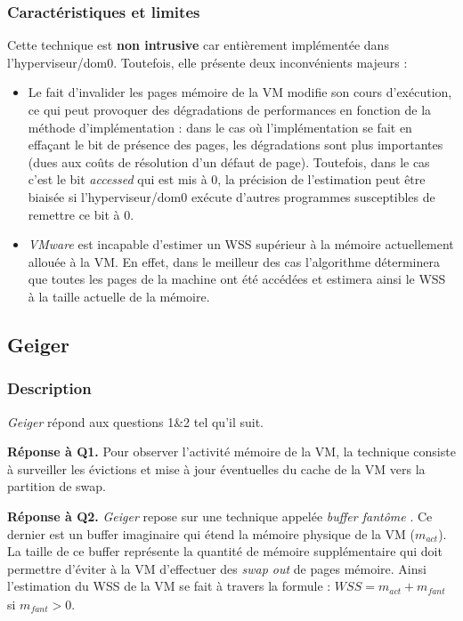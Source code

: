 \subsubsection{Caractéristiques et limites} 
Cette technique est \textbf{non intrusive} car entièrement implémentée dans l'hyperviseur/dom0. Toutefois, elle présente deux inconvénients majeurs : 
\begin{itemize}
    \item Le fait d'invalider les pages mémoire de la VM modifie son cours d'exécution, ce qui peut provoquer des dégradations de performances en fonction de la méthode d'implémentation : dans le cas où l'implémentation se fait en effaçant le bit de présence des pages, les dégradations sont plus importantes (dues aux coûts de résolution d'un défaut de page). Toutefois, dans le cas c'est le bit \textit{accessed} qui est mis à 0, la précision de l'estimation peut être biaisée si l'hyperviseur/dom0 exécute d'autres programmes susceptibles de remettre ce bit à 0.
    \item \textit{VMware} est incapable d'estimer un WSS supérieur à la mémoire actuellement allouée à la VM. En effet, dans le meilleur des cas l'algorithme déterminera que toutes les pages de la machine ont été accédées et estimera ainsi le WSS à la taille actuelle de la mémoire.
\end{itemize}

\subsection{Geiger}

\subsubsection{Description}
\textit{Geiger} \cite{geiger} répond aux questions 1\&2 tel qu'il suit.

\par{\textbf{Réponse à Q1.}} Pour observer l'activité mémoire de la VM, la technique consiste à surveiller les évictions et mise à jour éventuelles du cache de la VM vers la partition de swap.

\par{\textbf{Réponse à Q2.}} \textit{Geiger} repose sur une technique appelée \textit{buffer fantôme} \cite{ghost_buffer}. Ce dernier est un buffer imaginaire qui étend la mémoire physique de la VM ($\textit{m}_\textit{act}$). La taille de ce buffer représente la quantité de mémoire supplémentaire qui doit permettre d'éviter à la VM d'effectuer des \textit{swap out} de pages mémoire. Ainsi l'estimation du WSS de la VM se fait à travers la formule : $ WSS = \textit{m}_\textit{act} + \textit{m}_\textit{fant}$ si $\textit{m}_\textit{fant} > 0 $.

